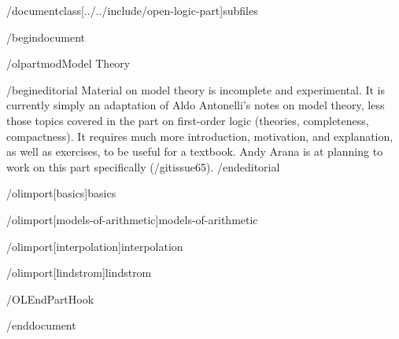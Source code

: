 
/documentclass[../../include/open-logic-part]{subfiles}

/begin{document}

/olpart{mod}{Model Theory}

/begin{editorial}
  Material on model theory is incomplete and experimental.  It is
  currently simply an adaptation of Aldo Antonelli's notes on model
  theory, less those topics covered in the part on first-order logic
  (theories, completeness, compactness).  It requires much more
  introduction, motivation, and explanation, as well as exercises, to
  be useful for a textbook.  Andy Arana is at planning to work on this
  part specifically (/gitissue{65}).
/end{editorial}

/olimport[basics]{basics}

/olimport[models-of-arithmetic]{models-of-arithmetic}

/olimport[interpolation]{interpolation}

/olimport[lindstrom]{lindstrom}

/OLEndPartHook

/end{document}
